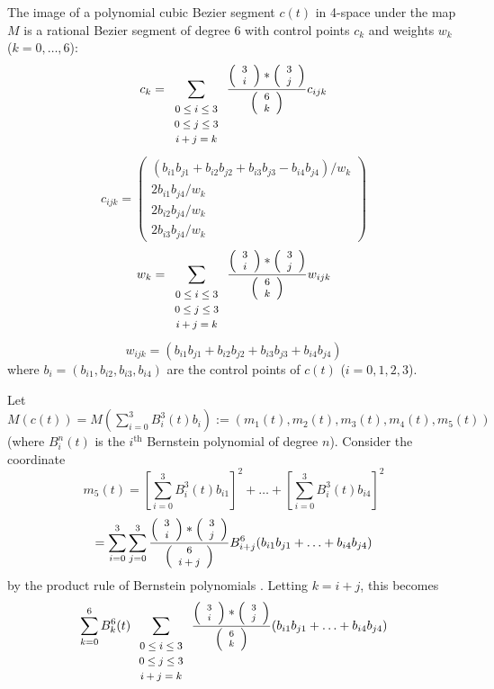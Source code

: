 \begin{lemma}
\label{sextic}
The image of a polynomial cubic Bezier segment $c(t)$ in 4-space 
under the map $M$
is a rational Bezier segment of degree 6 with control points $c_k$
and weights $w_k$ ($k = 0, \ldots, 6$):
\begin{equation}
\label{eq:control-pts}
c_k = \sum_{\begin{array}{c} \mbox{\footnotesize{$0 \leq i \leq 3$}} \\ 
			     \mbox{\footnotesize{$0 \leq j \leq 3$}} \\ 
			     \mbox{\footnotesize{$i+j=k$}}
			     \end{array}} 
        \frac{\mbox{\footnotesize{$\left( \begin{array}{c} 3 \\ i \end{array} \right)$}} * \mbox{\footnotesize{$\left( \begin{array}{c} 3 \\ j \end{array} \right)$}}}{\mbox{\footnotesize{$\left( \begin{array}{c} 6 \\ k \end{array} \right)$}}}
	c_{ijk}
\end{equation}
\[
	c_{ijk} = 
	\left( \begin{array}{c}
            (b_{i1} b_{j1} + b_{i2} b_{j2} + b_{i3} b_{j3} - b_{i4} b_{j4}) / w_k \\
            2b_{i1} b_{j4} / w_k \\
            2b_{i2} b_{j4} / w_k \\
            2b_{i3} b_{j4} / w_k
	\end{array} \right)
\]
\[
w_k = \sum_{\begin{array}{c} \mbox{\footnotesize{$0 \leq i \leq 3$}} \\ 
			     \mbox{\footnotesize{$0 \leq j \leq 3$}} \\ 
			     \mbox{\footnotesize{$i+j=k$}}
			     \end{array}}
        \frac{\mbox{\footnotesize{$\left( \begin{array}{c} 3 \\ i \end{array} \right)$}} * \mbox{\footnotesize{$\left( \begin{array}{c} 3 \\ j \end{array} \right)$}}}{\mbox{\footnotesize{$\left( \begin{array}{c} 6 \\ k \end{array} \right)$}}}
	w_{ijk}
\]
\[
w_{ijk} = (b_{i1} b_{j1} + b_{i2} b_{j2} + b_{i3} b_{j3} + b_{i4} b_{j4})
\]
where $b_i = (b_{i1},b_{i2},b_{i3},b_{i4})$ are the control points of $c(t)$
($i=0,1,2,3$).
\end{lemma}
\prf
Let $M(c(t)) = M(\sum_{i=0}^3 B_i^3(t) b_{i}) 
:= (m_1(t),m_2(t),m_3(t),m_4(t),m_5(t))$ 
(where $B_i^n(t)$ is the $i^{\mbox{th}}$ Bernstein polynomial of degree
$n$).
Consider the coordinate
\[ m_5(t) =  [\sum_{i=0}^3 B_i^3(t) b_{i1}]^2 + 
	\ldots + [\sum_{i=0}^3 B_i^3(t) b_{i4}]^2
\]
\[     =   \sum_{i=0}^3 \sum_{j=0}^3 
	\frac{\mbox{\footnotesize{$\left( \begin{array}{c} 3 \\ i \end{array} \right)$}} * \mbox{\footnotesize{$\left( \begin{array}{c} 3 \\ j \end{array} \right)$}}}{\mbox{\footnotesize{$\left( \begin{array}{c} 6 \\ i+j \end{array} \right)$}}}
       B^6_{i+j} (b_{i1} b_{j1} + \ldots + b_{i4} b_{j4})
\]
by the product rule of Bernstein polynomials \cite{farin93}.
Letting $k=i+j$, this becomes
\[ \sum_{k=0}^6 B_k^6(t) 
	\sum_{\begin{array}{c}  \mbox{\footnotesize{$0 \leq i \leq 3$}} \\ 
			     \mbox{\footnotesize{$0 \leq j \leq 3$}} \\ 
			     \mbox{\footnotesize{$i+j=k$}}
			     \end{array}} 
	\frac{\mbox{\scriptsize{$\left( \begin{array}{c} 3 \\ i \end{array} \right)$}} * \mbox{\scriptsize{$\left( \begin{array}{c} 3 \\ j \end{array} \right)$}}}{\mbox{\scriptsize{$\left( \begin{array}{c} 6 \\ k \end{array} \right)$}}}
	(b_{i1} b_{j1} + \ldots + b_{i4} b_{j4}) \]
